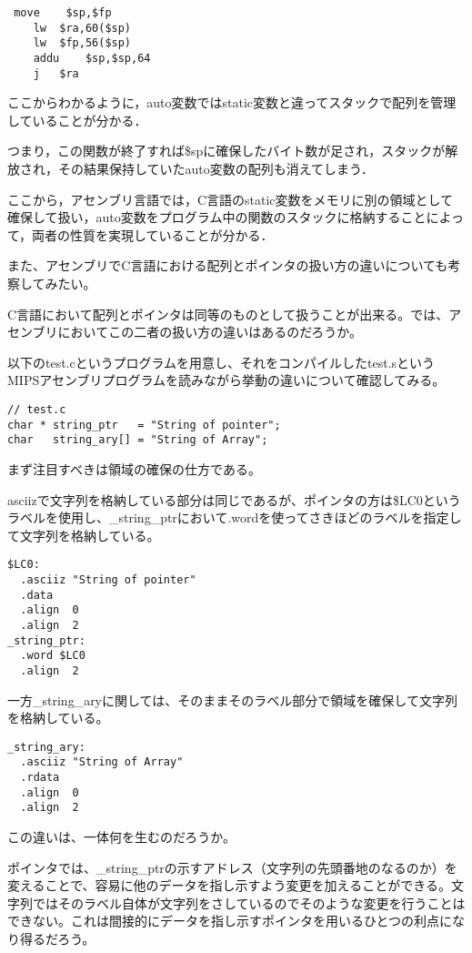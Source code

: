 \documentclass[a4j]{jarticle}
\begin{document}
\begin{verbatim}
 move    $sp,$fp
    lw  $ra,60($sp)
    lw  $fp,56($sp)
    addu    $sp,$sp,64
    j   $ra
\end{verbatim}

ここからわかるように，auto変数ではstatic変数と違ってスタックで配列を管理していることが分かる．

つまり，この関数が終了すれば\$spに確保したバイト数が足され，スタックが解放され，その結果保持していたauto変数の配列も消えてしまう．

ここから，アセンブリ言語では，C言語のstatic変数をメモリに別の領域として確保して扱い，auto変数をプログラム中の関数のスタックに格納することによって，両者の性質を実現していることが分かる．


また、アセンブリでC言語における配列とポインタの扱い方の違いについても考察してみたい。

C言語において配列とポインタは同等のものとして扱うことが出来る。では、アセンブリにおいてこの二者の扱い方の違いはあるのだろうか。

以下のtest.cというプログラムを用意し、それをコンパイルしたtest.sというMIPSアセンブリプログラムを読みながら挙動の違いについて確認してみる。

\begin{verbatim}
// test.c
char * string_ptr   = "String of pointer";
char   string_ary[] = "String of Array";
\end{verbatim}

まず注目すべきは領域の確保の仕方である。

asciizで文字列を格納している部分は同じであるが、ポインタの方は\$LC0というラベルを使用し、\_string\_ptrにおいて.wordを使ってさきほどのラベルを指定して文字列を格納している。

\begin{verbatim}
$LC0:
  .asciiz "String of pointer"
  .data
  .align  0
  .align  2
_string_ptr:
  .word $LC0
  .align  2
\end{verbatim}

一方\_string\_aryに関しては、そのままそのラベル部分で領域を確保して文字列を格納している。

\begin{verbatim}
_string_ary:
  .asciiz "String of Array"
  .rdata
  .align  0
  .align  2
\end{verbatim}

この違いは、一体何を生むのだろうか。

ポインタでは、\_string\_ptrの示すアドレス（文字列の先頭番地のなるのか）を変えることで、容易に他のデータを指し示すよう変更を加えることができる。文字列ではそのラベル自体が文字列をさしているのでそのような変更を行うことはできない。これは間接的にデータを指し示すポインタを用いるひとつの利点になり得るだろう。
\end{document}
